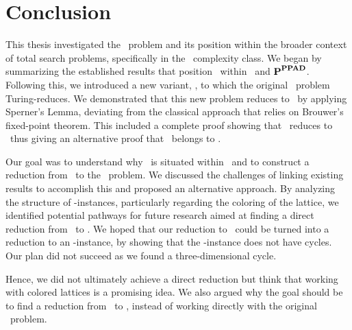 \chapter{Conclusion}\label{ch:conclusion}

This thesis investigated the \Tarski\ problem and its position within the broader context of total search problems, specifically in the \TFNP\ complexity class. We began by summarizing the established results that position \Tarski\ within \PLS\ and ${\textbf{P}}^{\textbf{PPAD}}$. Following this, we introduced a new variant, \Tarskistar, to which the original \Tarski\ problem Turing-reduces. We demonstrated that this new problem reduces to \EndOfLine\ by applying Sperner's Lemma, deviating from the classical approach that relies on Brouwer's fixed-point theorem. This included a complete proof showing that \Sperner\ reduces to \EndOfLine\ thus giving an alternative proof that \Tarski\ belongs to \PPAD\@.

Our goal was to understand why \Tarski\ is situated within \EOPL\ and to construct a reduction from \Tarski\ to the \EndOfPotentialLine\ problem. We discussed the challenges of linking existing results to accomplish this and proposed an alternative approach. By analyzing the structure of \Tarski-instances, particularly regarding the coloring of the lattice, we identified potential pathways for future research aimed at finding a direct reduction from \Tarski\ to \EndOfPotentialLine. We hoped that our reduction to \EndOfLine\ could be turned into a reduction to an \EndOfPotentialLine-instance, by showing that the \EndOfLine-instance does not have cycles. Our plan did not succeed as we found a three-dimensional cycle.

Hence, we did not ultimately achieve a direct reduction but think that working with colored lattices is a promising idea. We also argued why the goal should be to find a reduction from \Tarskistar\ to \EndOfPotentialLine\@, instead of working directly with the original \Tarski\ problem.